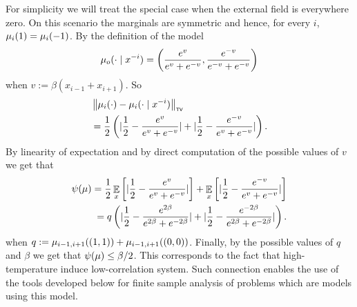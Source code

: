 \documentclass[12pt,a4paper,oneside,onecolumn]{book}
\begin{document}
{\begin{example}
  For simplicity we will treat the special case when the external field is everywhere zero.
  On this scenario the marginals are symmetric and hence,
for every $i$,
$\mu_i(1) = \mu_i(-1)$.
By the definition of the model
\[
\mu_o(\cdot\mid x^{-i})
= \left(\frac{e^v}{e^v+e^{-v}},\frac{e^{-v}}{e^{-v}+e^{-v}}\right)
\]
when $v := \beta(x_{i-1} + x_{i+1})$.
So
\begin{align*}
  &\left\lVert\mu_i(\cdot) - \mu_i(\cdot\mid x^{-i})\right\rVert_{\textup{\tiny\textsf{TV}}}\\ 
  &=
  \frac{1}{2}
  \left(
    \lvert\frac{1}{2} - \frac{e^v}{e^v+e^{-v}}\rvert
    +
    \lvert\frac{1}{2} - \frac{e^{-v}}{e^v+e^{-v}}\rvert
  \right).
\end{align*}
By linearity of expectation and by direct computation of the possible values of $v$
we get that
\begin{align*}
  \psi(\mu) =
  \frac{1}{2}
  \mathop{\mathbb{E}}_{x}\left[
    \lvert\frac{1}{2} - \frac{e^v}{e^v+e^{-v}}\rvert
  \right] + 
  \mathop{\mathbb{E}}_{x}\left[
    \lvert\frac{1}{2} - \frac{e^{-v}}{e^v+e^{-v}}\rvert
  \right]\\
  =
  q\left(
    \lvert\frac{1}{2} - \frac{e^{2\beta}}{e^{2\beta}+e^{-2\beta}}\rvert
    +
    \lvert\frac{1}{2} - \frac{e^{-2\beta}}{e^{2\beta}+e^{-2\beta}}\rvert
  \right).    
\end{align*}
when $q := \mu_{i-1,i+1}((1,1)) + \mu_{i-1,i+1}((0,0))$.
Finally, by the possible values of $q$ and $\beta$ we get that
$\psi(\mu) \leq \beta/2$.
This corresponds to the fact that high-temperature
induce low-correlation system.
  Such connection enables the use of the tools developed below for
  finite sample analysis of problems which are models using this model. 
\end{example}
}




\remove{
}

  

  
  
\end{document}
